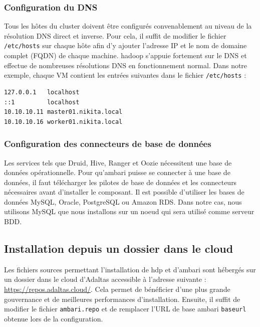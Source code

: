 \documentclass[12pt, french]{report}
\begin{document}
\subsubsection{Configuration du DNS}

Tous les hôtes du cluster doivent être configurés convenablement au niveau de la résolution DNS direct et inverse. Pour cela, il suffit de modifier le fichier \texttt{/etc/hosts} sur chaque hôte afin d'y ajouter l'adresse IP et le nom de domaine complet (FQDN) de chaque machine. \gls{hadoop} s'appuie fortement sur le DNS et effectue de nombreuses résolutions DNS en fonctionnement normal. Dans notre exemple, chaque VM contient les entrées suivantes dans le fichier \texttt{/etc/hosts} :

\begin{verbatim}
127.0.0.1   localhost
::1         localhost
10.10.10.11 master01.nikita.local
10.10.10.16 worker01.nikita.local
\end{verbatim}

\subsubsection{Configuration des connecteurs de base de données}

Les services tels que Druid, Hive, Ranger et Oozie nécessitent une base de données opérationnelle. Pour qu'\gls{ambari} puisse se connecter à une base de données, il faut télécharger les pilotes de base de données et les connecteurs nécessaires avant d'installer le composant. Il est possible d'utiliser les bases de données MySQL, Oracle, PostgreSQL ou Amazon RDS. Dans notre cas, nous utilisons MySQL que nous installons sur un noeud qui sera utilisé comme serveur BDD.

\subsection{Installation depuis un dossier dans le cloud}

Les fichiers sources permettant l'installation de \gls{hdp} et d'\gls{ambari} sont hébergés sur un dossier dans le cloud d'Adaltas accessible à l'adresse suivante : \href{https://repos.adaltas.cloud/}{https://repos.adaltas.cloud/}. Cela permet de bénéficier d'une plus grande gouvernance et de meilleures performances d'installation. Ensuite, il suffit de modifier le fichier \texttt{ambari.repo} et de remplacer l'URL de base \gls{ambari} \texttt{baseurl} obtenue lors de la configuration.
\end{document}
